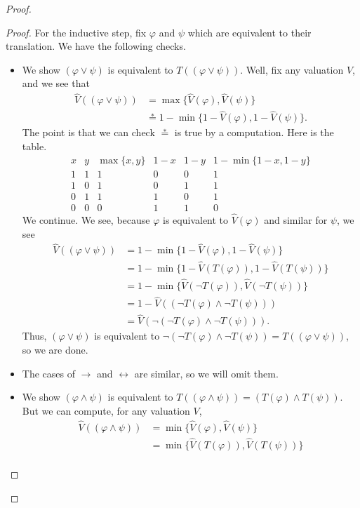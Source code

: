 \begin{proof}
\begin{proof}
		For the inductive step, fix $\varphi$ and $\psi$ which are equivalent to their translation. We have the following checks.
		\begin{itemize}
			\item We show $(\varphi\lor\psi)$ is equivalent to $T((\varphi\lor\psi))$. Well, fix any valuation $V$, and we see that
			\begin{align*}
				\hat V((\varphi\lor\psi)) &= \max\{\hat V(\varphi),\hat V(\psi)\} \\
				&\stackrel*= 1-\min\{1-\hat V(\varphi),1-\hat V(\psi)\}.
			\end{align*}
			The point is that we can check $\stackrel*=$ is true by a computation. Here is the table.
			\[\begin{array}{c|c||c||c|c|c}
				x & y & \max\{x,y\} & 1-x & 1-y & 1-\min\{1-x,1-y\} \\
				\hline
				1 & 1 & 1 & 0 & 0 & 1 \\
				1 & 0 & 1 & 0 & 1 & 1 \\
				0 & 1 & 1 & 1 & 0 & 1 \\
				0 & 0 & 0 & 1 & 1 & 0
			\end{array}\]
			We continue. We see, because $\varphi$ is equivalent to $\hat V(\varphi)$ and similar for $\psi$, we see
			\begin{align*}
				\hat V((\varphi\lor\psi)) &= 1-\min\{1-\hat V(\varphi),1-\hat V(\psi)\} \\
				&= 1-\min\{1-\hat V(T(\varphi)),1-\hat V(T(\psi))\} \\
				&= 1-\min\{\hat V(\lnot T(\varphi)),\hat V(\lnot T(\psi))\} \\
				&= 1-\hat V((\lnot T(\varphi)\land\lnot T(\psi))) \\
				&= \hat V(\lnot(\lnot T(\varphi)\land\lnot T(\psi))).
			\end{align*}
			Thus, $(\varphi\lor\psi)$ is equivalent to $\lnot(\lnot T(\varphi)\land\lnot T(\psi))=T((\varphi\lor\psi))$, so we are done.
			\item The cases of $\to$ and $\leftrightarrow$ are similar, so we will omit them.
			\item We show $(\varphi\land\psi)$ is equivalent to $T((\varphi\land\psi))=(T(\varphi)\land T(\psi))$. But we can compute, for any valuation $V$,
			\begin{align*}
				\hat V((\varphi\land\psi)) &= \min\{\hat V(\varphi),\hat V(\psi)\} \\
				&= \min\{\hat V(T(\varphi)),\hat V(T(\psi))\} \\

\end{align*}
\end{itemize}
\end{proof}
\end{proof}
